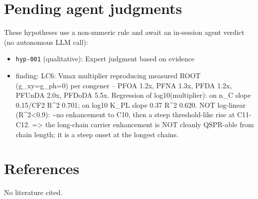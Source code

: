 \documentclass{article}
\begin{document}
\section{Pending agent judgments}
These hypotheses use a non-numeric rule and await an in-session agent verdict (no autonomous LLM call):
\begin{itemize}
  \item \texttt{hyp-001} (qualitative): Expert judgment based on evidence
  \item finding: LC6: Vmax multiplier reproducing measured ROOT (g\_xy=g\_ph=0) per congener -- PFOA 1.2x, PFNA 1.3x, PFDA 1.2x, PFUnDA 2.0x, PFDoDA 5.5x. Regression of log10(multiplier): on n\_C slope 0.15/CF2 R\textasciicircum{}2 0.701; on log10 K\_PL slope 0.37 R\textasciicircum{}2 0.620. NOT log-linear (R\textasciicircum{}2<0.9): \textasciitilde{}no enhancement to C10, then a steep threshold-like rise at C11-C12. => the long-chain carrier enhancement is NOT cleanly QSPR-able from chain length; it is a steep onset at the longest chains.
\end{itemize}

\section{References}
No literature cited.
\end{document}

